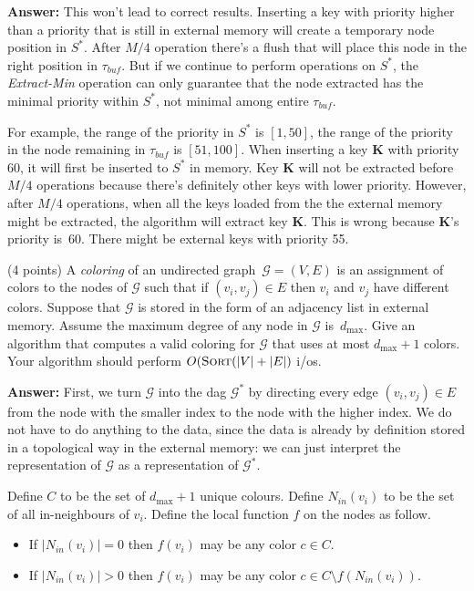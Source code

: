 \documentclass{article}
\newcommand{\G}{\ensuremath{\mathcal{G}}}
\newcommand{\io}{{\sc i/o}\xspace}
\newcommand{\ios}{{\io}s\xspace}
\newcommand{\sort}{\mbox{\sc Sort}}
\newcounter{rcounter}
\newenvironment{rlist}%
{\begin{list}{\setnr-\arabic{rcounter}}{\usecounter{rcounter}}}{\end{list}}
\begin{document}
\begin{rlist}
        \textbf{Answer:}
        This won't lead to correct results. Inserting a key with priority higher than a priority that is still in external memory will create a temporary node position in $S^*$. After $M/4$ operation there's a flush that will place this node in the right position in $\tau_{buf}$. But if we continue to perform operations on $S^*$, the \emph{Extract-Min} operation can only guarantee that the node extracted has the minimal priority within $S^*$, not minimal among entire $\tau_{buf}$. 
        
        For example, the range of the priority in $S^*$ is $[1, 50]$, the range of the priority in the node remaining in $\tau_{buf}$ is $[51, 100]$. When inserting a key \textbf{K} with priority 60, it will first be inserted to $S^*$ in memory. Key \textbf{K} will not be extracted before $M/4$ operations because there's definitely other keys with lower priority. However, after $M/4$ operations, when all the keys loaded from the the external memory might be extracted, the algorithm will extract key \textbf{K}. This is wrong because \textbf{K}'s priority is~60. There might be external keys with priority 55.
        
        \item (4 points)
        A \emph{coloring} of an undirected graph~$\G=(V,E)$ is an assignment of colors to the nodes of $\G$ such that if $(v_i,v_j)\in E$ then $v_i$ and $v_j$ have different colors. Suppose that $\G$ is stored in the form of an adjacency list in external memory. Assume the maximum degree of any node in $\G$ is~$d_{\max}$. Give an algorithm that computes a valid coloring for $\G$ that uses at most $d_{\max}+1$ colors. Your algorithm should perform $O(\sort(|V|+|E|)$ \ios.
        
        \textbf{Answer:}
        First, we turn $\G$ into the {\sc dag} $\G^*$ by directing every edge $(v_i, v_j) \in E$ from the node with the smaller index to the node with the higher index. We do not have to do anything to the data, since the data is already by definition stored in a topological way in the external memory: we can just interpret the representation of $\G$ as a representation of $\G^*$.
        
        Define $C$ to be the set of $d_{\max}+1$ unique colours. Define $N_{in}(v_i)$ to be the set of all in-neighbours of $v_i$. Define the local function $f$ on the nodes as follow.
        \begin{itemize}
            \item
            If $|N_{in}(v_i)| = 0$ then $f(v_i)$ may be any color $c \in C$.
            \item
            If $|N_{in}(v_i)| > 0$ then $f(v_i)$ may be any color $c \in C \setminus f\left(N_{in}(v_i)\right)$.
        \end{itemize}
        

\end{rlist}
\end{document}

